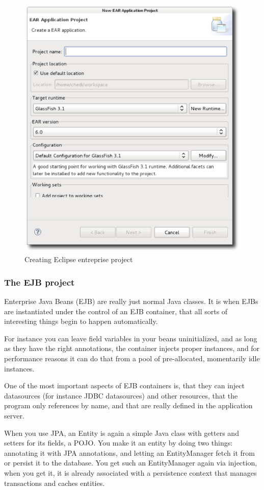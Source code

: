 \begin{figure}
  \begin{center}
  \includegraphics[scale=0.8]{Figures/New_entreprise_project_wizard.eps}
  \end{center}
  \caption{Creating Eclipse entreprise project}
  \label{Creating Eclipse entreprise project}
\end{figure}
\pagebreak

\subsubsection{The EJB project}
Enterprise Java Beans (EJB) are really just normal Java classes. It is when EJBs are instantiated under the control of an EJB container, that all sorts of interesting things begin to happen automatically.

For instance you can leave field variables in your beans uninitialized, and as long as they have the right annotations, the container injects proper instances, and for performance reasons it can do that from a pool of pre-allocated, momentarily idle instances.

One of the most important aspects of EJB containers is, that they can inject datasources (for instance JDBC datasources) and other resources, that the program only references by name, and that are really defined in the application server.

When you use JPA, an Entity is again a simple Java class with getters and setters for its fields, a POJO. You make it an entity by doing two things: annotating it with JPA annotations, and letting an EntityManager fetch it from or persist it to the database. You get such an EntityManager again via injection, when you get it, it is already associated with a persistence context that manages transactions and caches entities.